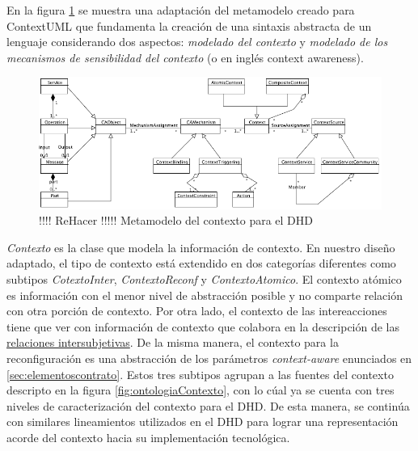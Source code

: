 En la figura \ref{fig:contextMetamodel} se muestra una adaptación del
metamodelo creado para ContextUML \cite{contextUML} que fundamenta la
creación de una sintaxis abstracta de un lenguaje considerando dos
aspectos:
\textit{modelado del contexto} y \textit{modelado de los mecanismos
de sensibilidad del contexto} (o en inglés context awareness).


\begin{figure} 
\begin{center}
 \includegraphics [width=5 in,totalheight=3 in]
{Ch1/Figuras/contextMetamodel}
\caption {!!!! ReHacer !!!!! Metamodelo del contexto para el DHD }
\label{fig:contextMetamodel}
\end{center}
\end{figure}



\textit{Contexto} es la clase que modela la información de contexto. En nuestro
diseño adaptado, el tipo de contexto está extendido en dos categorías
diferentes como subtipos \textit{CotextoInter}, \textit{ContextoReconf} y
\textit{ContextoAtomico}. El contexto atómico es información con el menor
nivel de abstracción posible y no comparte relación con otra porción de
contexto. Por otra lado, el contexto de las intereacciones tiene que ver con
información de contexto que colabora en la descripción de las 
\hyperref[intersubjetivas]{relaciones intersubjetivas}. De la misma manera, el
contexto para la reconfiguración es una abstracción de los parámetros
\textit{context-aware} enunciados en \ref{sec:elementoscontrato}. Estos tres
subtipos agrupan a las fuentes del contexto descripto en la figura
\ref{fig:ontologiaContexto}, con lo cúal ya se cuenta con tres niveles de
caracterización del contexto para el DHD. De esta manera, se continúa con similares lineamientos utilizados en el DHD para lograr una representación
acorde del contexto hacia su implementación tecnológica. 


